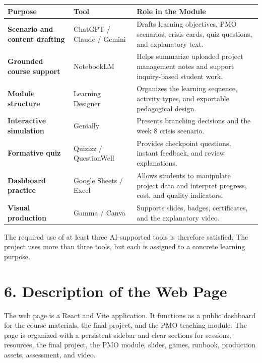 \documentclass[11pt,a4paper]{article}
\begin{document}
\begin{longtable}{>{\bfseries}p{4cm}p{4cm}p{6.2cm}}
\textbf{Purpose} & \textbf{Tool} & \textbf{Role in the Module} \\
\hline
Scenario and content drafting & ChatGPT / Claude / Gemini & Drafts learning objectives, PMO scenarios, crisis cards, quiz questions, and explanatory text. \\
Grounded course support & NotebookLM & Helps summarize uploaded project management notes and support inquiry-based student work. \\
Module structure & Learning Designer & Organizes the learning sequence, activity types, and exportable pedagogical design. \\
Interactive simulation & Genially & Presents branching decisions and the week 8 crisis scenario. \\
Formative quiz & Quizizz / QuestionWell & Provides checkpoint questions, instant feedback, and review explanations. \\
Dashboard practice & Google Sheets / Excel & Allows students to manipulate project data and interpret progress, cost, and quality indicators. \\
Visual production & Gamma / Canva & Supports slides, badges, certificates, and the explanatory video. \\
\end{longtable}

The required use of at least three AI-supported tools is therefore satisfied. The project uses more than three tools, but each is assigned to a concrete learning purpose.

\section*{6. Description of the Web Page}

The web page is a React and Vite application. It functions as a public dashboard for the course materials, the final project, and the PMO teaching module. The page is organized with a persistent sidebar and clear sections for sessions, resources, the final project, the PMO module, slides, games, runbook, production assets, assessment, and video.
\end{document}
